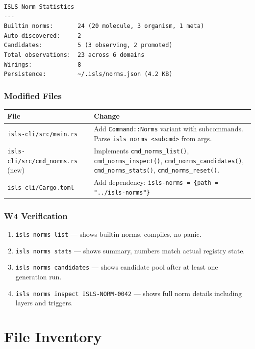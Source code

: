 \documentclass[11pt,a4paper]{article}
\begin{document}
\begin{lstlisting}[style=bash]
ISLS Norm Statistics
---
Builtin norms:       24 (20 molecule, 3 organism, 1 meta)
Auto-discovered:     2
Candidates:          5 (3 observing, 2 promoted)
Total observations:  23 across 6 domains
Wirings:             8
Persistence:         ~/.isls/norms.json (4.2 KB)
\end{lstlisting}

\subsubsection{Modified Files}

\begin{longtable}{lp{10cm}}
\toprule
\textbf{File} & \textbf{Change} \\
\midrule
\texttt{isls-cli/src/main.rs}
  & Add \texttt{Command::Norms} variant with subcommands. Parse 
    \texttt{isls norms <subcmd>} from args. \\
\texttt{isls-cli/src/cmd\_norms.rs} (new)
  & Implements \texttt{cmd\_norms\_list()}, \texttt{cmd\_norms\_inspect()}, 
    \texttt{cmd\_norms\_candidates()}, \texttt{cmd\_norms\_stats()}, 
    \texttt{cmd\_norms\_reset()}. \\
\texttt{isls-cli/Cargo.toml}
  & Add dependency: \texttt{isls-norms = \{path = "../isls-norms"\}} \\
\bottomrule
\end{longtable}

\subsubsection{W4 Verification}

\begin{enumerate}[nosep]
\item \texttt{isls norms list} --- shows builtin norms, compiles, 
      no panic.
\item \texttt{isls norms stats} --- shows summary, numbers match 
      actual registry state.
\item \texttt{isls norms candidates} --- shows candidate pool after 
      at least one generation run.
\item \texttt{isls norms inspect ISLS-NORM-0042} --- shows full 
      norm details including layers and triggers.
\end{enumerate}


\section{File Inventory}
\end{document}
